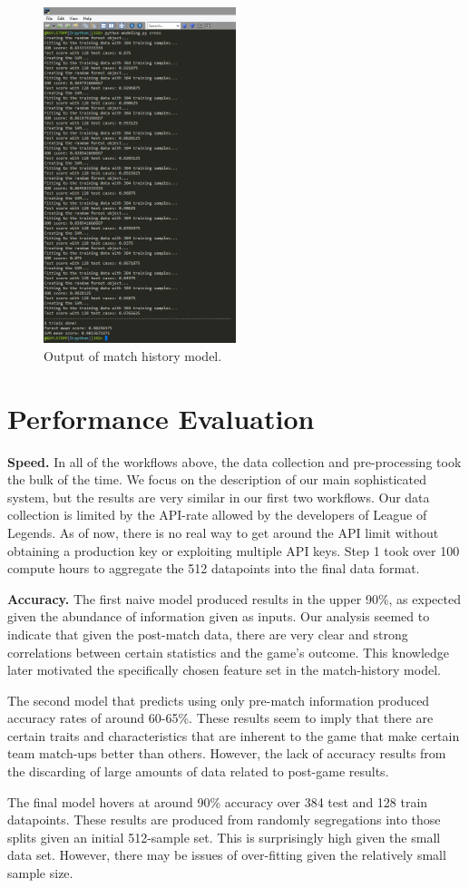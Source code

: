 \begin{figure}[t!]
  \centering
    \includegraphics[width=0.5\textwidth]{modelscore}
  \caption{Output of match history model.}
  \label{fig:modelscore}
\end{figure}

\section{Performance Evaluation}
\textbf{Speed. } In all of the workflows above, the data collection and pre-processing took the bulk of the time.  We focus on the description of our main sophisticated system, but the results are very similar in our first two workflows.  Our data collection is limited by the API-rate allowed by the developers of League of Legends.  As of now, there is no real way to get around the API limit without obtaining a 
production key or exploiting multiple API keys. Step 1 took over 100 compute hours to aggregate the 512 datapoints into the final data format.

\textbf{Accuracy. } The first naive model produced results in the upper 90\%, as expected given the abundance of information given as inputs.  Our analysis seemed to indicate that given the post-match data, there are very clear and strong correlations between certain statistics and the game's outcome.  This knowledge later motivated the specifically chosen feature set in the match-history model.

The second model that predicts using only pre-match information produced accuracy rates of around 60-65\%.  These results seem to imply that there are certain traits and characteristics that are inherent to the game that make certain team match-ups better than others.  However, the lack of accuracy results from the discarding of large amounts of data related to post-game results.  

The final model hovers at around 90\% accuracy over 384 test and 128 train datapoints. These results are produced from randomly segregations into those splits given an initial 512-sample set. This is surprisingly high given the small data set.  However, there may be issues of over-fitting given the relatively small sample size.
